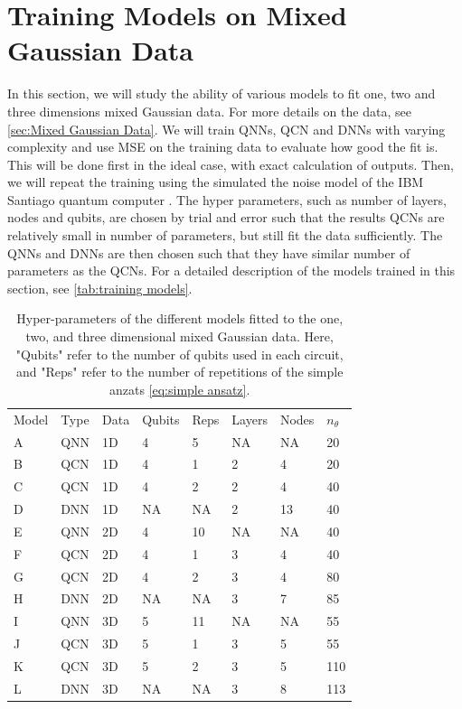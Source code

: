 \section{Training Models on Mixed Gaussian Data}\label{sec:Training Models}
In this section, we will study the ability of various models to fit one, two and three dimensions mixed Gaussian data. For more details on the data, see \autoref{sec:Mixed Gaussian Data}. We will train QNNs, QCN and DNNs with varying complexity and use MSE on the training data to evaluate how good the fit is. This will be done first in the ideal case, with exact calculation of outputs. Then, we will repeat the training using the simulated the noise model of the IBM Santiago quantum computer \cite{santiago}. The hyper parameters, such as number of layers, nodes and qubits, are chosen by trial and error such that the results QCNs are relatively small in number of parameters, but still fit the data sufficiently. The QNNs and DNNs are then chosen such that they have similar number of parameters as the QCNs. For a detailed description of the models trained in this section, see \autoref{tab:training models}.

\begin{table}[H]
\centering
\caption{Hyper-parameters of the different models fitted to the one, two, and three dimensional mixed Gaussian data. Here, "Qubits" refer to the number of qubits used in each circuit, and "Reps" refer to the number of repetitions of the simple anzats \autoref{eq:simple ansatz}.} 
\begin{tabular}{|l|l|l|l|l|l|l|l|}
\hline
Model& Type& Data& Qubits& Reps& Layers & Nodes &$n_{\theta}$ \\ \Xhline{3\arrayrulewidth}
A    & QNN & 1D  & 4     & 5&NA     & NA& 20   \\ \hline
B    & QCN & 1D  & 4     & 1&2      & 4& 20 \\ \hline
C    & QCN & 1D  & 4     & 2&2      & 4& 40  \\ \hline
D    & DNN & 1D  & NA    & NA&2      & 13& 40  \\ \Xhline{3\arrayrulewidth}
E    & QNN & 2D  & 4     & 10&NA     & NA& 40  \\ \hline
F    & QCN & 2D  & 4     & 1&3      & 4& 40  \\ \hline
G    & QCN & 2D  & 4     & 2&3      & 4& 80  \\ \hline
H    & DNN & 2D  & NA    & NA&3      & 7& 85  \\ \Xhline{3\arrayrulewidth}
I    & QNN & 3D  & 5     & 11&NA     & NA& 55  \\ \hline
J    & QCN & 3D  & 5     & 1&3      & 5& 55  \\ \hline
K    & QCN & 3D  & 5     & 2&3      & 5& 110  \\ \hline
L    & DNN & 3D  & NA    & NA&3      & 8& 113  \\ \hline
\end{tabular}

\label{tab:training models}
\end{table}

